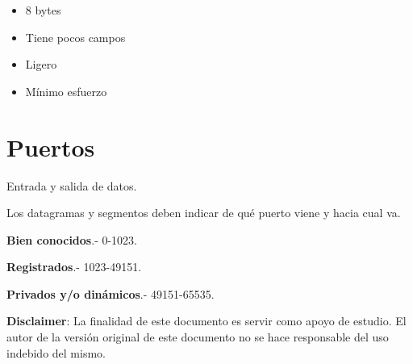 \documentclass{article}
\begin{document}
\begin{itemize}
	\item
	8 bytes
	\item
	Tiene pocos campos
	\item
	Ligero
	\item
	Mínimo esfuerzo
\end{itemize}
\vspace{1em}

\section{Puertos}

Entrada y salida de datos.
\vspace{1em}

Los datagramas y segmentos deben indicar de qué puerto viene y hacia cual va.
\vspace{1em}

\textbf{Bien conocidos}.- 0-1023.

\textbf{Registrados}.- 1023-49151.

\textbf{Privados y/o dinámicos}.- 49151-65535.
\vspace{1em}

\textbf{Disclaimer}: La finalidad de este documento es servir como apoyo de estudio.
El autor de la versión original de este documento no se hace responsable del
uso indebido del mismo.
\end{document}

